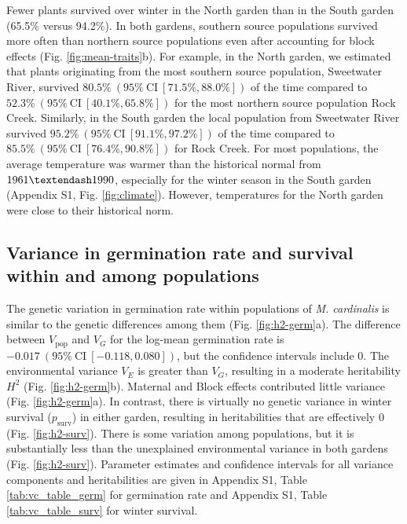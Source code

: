 \documentclass[
  12pt,
]{article}
\begin{document}
Fewer plants survived over winter in the North garden than in the South garden (65.5\% versus 94.2\%). In both gardens, southern source populations survived more often than northern source populations even after accounting for block effects (Fig. \ref{fig:mean-traits}b). For example, in the North garden, we estimated that plants originating from the most southern source population, Sweetwater River, survived \(80.5\%~(95\%~\text{CI}~[71.5\%, 88.0\%])\) of the time compared to \(52.3\%~(95\%~\text{CI}~[40.1\%, 65.8\%])\) for the most northern source population Rock Creek. Similarly, in the South garden the local population from Sweetwater River survived \(95.2\%~(95\%~\text{CI}~[91.1\%, 97.2\%])\) of the time compared to \(85.5\%~(95\%~\text{CI}~[76.4\%, 90.8\%])\) for Rock Creek. For most populations, the average temperature was warmer than the historical normal from \(1961 \textendash 1990\), especially for the winter season in the South garden (Appendix S1, Fig. \ref{fig:climate}). However, temperatures for the North garden were close to their historical norm.

\hypertarget{variance-in-germination-rate-and-survival-within-and-among-populations}{%
\subsection{Variance in germination rate and survival within and among populations}\label{variance-in-germination-rate-and-survival-within-and-among-populations}}

The genetic variation in germination rate within populations of \emph{M. cardinalis} is similar to the genetic differences among them (Fig. \ref{fig:h2-germ}a). The difference between \(V_\text{pop}\) and \(V_G\) for the log-mean germination rate is \(-0.017~(95\%~\text{CI}~[-0.118, 0.080])\), but the confidence intervals include \(0\). The environmental variance \(V_E\) is greater than \(V_G\), resulting in a moderate heritability \(H^2\) (Fig. \ref{fig:h2-germ}b). Maternal and Block effects contributed little variance (Fig. \ref{fig:h2-germ}a). In contrast, there is virtually no genetic variance in winter survival (\(p_\text{surv}\)) in either garden, resulting in heritabilities that are effectively \(0\) (Fig. \ref{fig:h2-surv}). There is some variation among populations, but it is substantially less than the unexplained environmental variance in both gardens (Fig. \ref{fig:h2-surv}). Parameter estimates and confidence intervals for all variance components and heritabilities are given in Appendix S1, Table \ref{tab:vc_table_germ} for germination rate and Appendix S1, Table \ref{tab:vc_table_surv} for winter survival.
\end{document}

